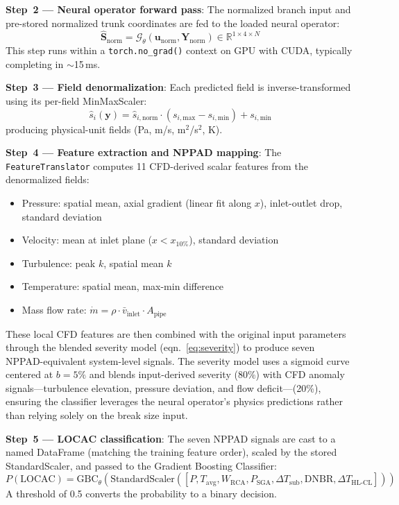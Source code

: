 \documentclass[conference]{IEEEtran}
\begin{document}
\textbf{Step~2 --- Neural operator forward pass}: The normalized branch input and pre-stored normalized trunk coordinates are fed to the loaded neural operator:
\begin{equation}
\hat{\bm{S}}_\text{norm} = \mathcal{G}_\theta(\bm{u}_\text{norm}, \bm{Y}_\text{norm}) \in \mathbb{R}^{1 \times 4 \times N}
\end{equation}
This step runs within a \texttt{torch.no\_grad()} context on GPU with CUDA, typically completing in $\sim$15\,ms.

\textbf{Step~3 --- Field denormalization}: Each predicted field is inverse-transformed using its per-field MinMaxScaler:
\begin{equation}
\hat{s}_i(\bm{y}) = \hat{s}_{i,\text{norm}} \cdot (s_{i,\text{max}} - s_{i,\text{min}}) + s_{i,\text{min}}
\end{equation}
producing physical-unit fields (Pa, m/s, m$^2$/s$^2$, K).

\textbf{Step~4 --- Feature extraction and NPPAD mapping}: The \texttt{FeatureTranslator} computes 11 CFD-derived scalar features from the denormalized fields:
\begin{itemize}
    \item Pressure: spatial mean, axial gradient (linear fit along $x$), inlet-outlet drop, standard deviation
    \item Velocity: mean at inlet plane ($x < x_{10\%}$), standard deviation
    \item Turbulence: peak $k$, spatial mean $k$
    \item Temperature: spatial mean, max-min difference
    \item Mass flow rate: $\dot{m} = \rho \cdot \bar{v}_\text{inlet} \cdot A_\text{pipe}$
\end{itemize}

These local CFD features are then combined with the original input parameters through the blended severity model (eqn.~\ref{eq:severity}) to produce seven NPPAD-equivalent system-level signals. The severity model uses a sigmoid curve centered at $b = 5\%$ and blends input-derived severity (80\%) with CFD anomaly signals---turbulence elevation, pressure deviation, and flow deficit---(20\%), ensuring the classifier leverages the neural operator's physics predictions rather than relying solely on the break size input.

\textbf{Step~5 --- LOCAC classification}: The seven NPPAD signals are cast to a named DataFrame (matching the training feature order), scaled by the stored StandardScaler, and passed to the Gradient Boosting Classifier:
\begin{equation}
P(\text{LOCAC}) = \text{GBC}_\theta\!\left(\text{StandardScaler}\!\left([P, T_\text{avg}, W_\text{RCA}, P_\text{SGA}, \Delta T_\text{sub}, \text{DNBR}, \Delta T_\text{HL-CL}]\right)\right)
\end{equation}
A threshold of 0.5 converts the probability to a binary decision.
\end{document}
